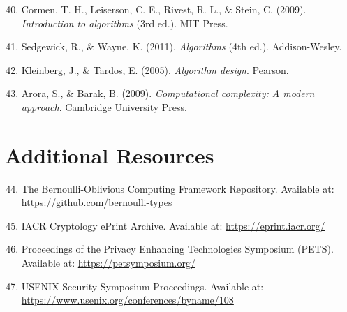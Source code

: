 \begin{enumerate}
\setcounter{enumi}{39}
\item Cormen, T. H., Leiserson, C. E., Rivest, R. L., \& Stein, C. (2009). \textit{Introduction to algorithms} (3rd ed.). MIT Press.

\item Sedgewick, R., \& Wayne, K. (2011). \textit{Algorithms} (4th ed.). Addison-Wesley.

\item Kleinberg, J., \& Tardos, E. (2005). \textit{Algorithm design}. Pearson.

\item Arora, S., \& Barak, B. (2009). \textit{Computational complexity: A modern approach}. Cambridge University Press.
\end{enumerate}

\section*{Additional Resources}

\begin{enumerate}
\setcounter{enumi}{43}
\item The Bernoulli-Oblivious Computing Framework Repository. Available at: \url{https://github.com/bernoulli-types}

\item IACR Cryptology ePrint Archive. Available at: \url{https://eprint.iacr.org/}

\item Proceedings of the Privacy Enhancing Technologies Symposium (PETS). Available at: \url{https://petsymposium.org/}

\item USENIX Security Symposium Proceedings. Available at:\\ \url{https://www.usenix.org/conferences/byname/108}
\end{enumerate}